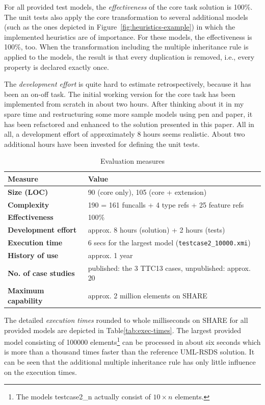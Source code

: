 \documentclass[submission]{eptcs}
\begin{document}
For all provided test models, the \emph{effectiveness} of the core task
solution is 100\%.  The unit tests also apply the core transformation to
several additional models (such as the ones depicted in
Figure~\ref{fig:heuristics-example}) in which the implemented heuristics are of
importance.  For these models, the effectiveness is 100\%, too.  When the
transformation including the multiple inheritance rule is applied to the
models, the result is that every duplication is removed, i.e., every property
is declared exactly once.

The \emph{development effort} is quite hard to estimate retrospectively,
because it has been an on-off task.  The initial working version for the core
task has been implemented from scratch in about two hours.  After thinking
about it in my spare time and restructuring some more sample models using pen
and paper, it has been refactored and enhanced to the solution presented in
this paper.  All in all, a development effort of approximately 8 hours seems
realistic.  About two additional hours have been invested for defining the unit
tests.

\begin{table}[htb]
  \centering
  \begin{tabular}{| l | l |}
    \hline
    \textbf{Measure}            & \textbf{Value}\\
    \hline
    \textbf{Size (LOC)}         & 90 (core only), 105 (core + extension)\\
    \textbf{Complexity}         & 190 = 161 funcalls + 4 type refs + 25 feature refs\\
    \textbf{Effectiveness}      & 100\%\\
    \textbf{Development effort} & approx. 8 hours (solution) + 2 hours (tests)\\
    \textbf{Execution time}     & 6 secs for the largest model (\verb|testcase2_10000.xmi|)\\
    \textbf{History of use}     & approx. 1 year\\
    \textbf{No. of case studies}& published: the 3 TTC13 cases, unpublished: approx. 20\\
    \textbf{Maximum capability} & approx. 2 million elements on SHARE\\
    \hline
  \end{tabular}
  \caption{Evaluation measures}
  \label{tab:evaluation}
\end{table}

The detailed \emph{execution times} rounded to whole milliseconds on SHARE for
all provided models are depicted in Table\ref{tab:exec-times}.  The largest
provided model consisting of 100000 elements\footnote{The models
  \textsf{testcase2\_n} actually consist of $10\times n$ elements.} can be
processed in about six seconds which is more than a thousand times faster than
the reference UML-RSDS solution.  It can be seen that the additional multiple
inheritance rule has only little influence on the execution times.
\end{document}
